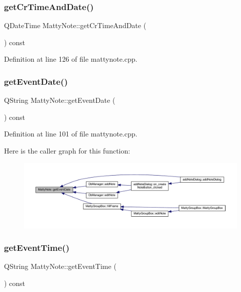 \subsubsection{\texorpdfstring{get\+Cr\+Time\+And\+Date()}{getCrTimeAndDate()}}
{\footnotesize\ttfamily Q\+Date\+Time Matty\+Note\+::get\+Cr\+Time\+And\+Date (\begin{DoxyParamCaption}{ }\end{DoxyParamCaption}) const}



Definition at line 126 of file mattynote.\+cpp.

\hypertarget{classMattyNote_a7294508de8cdfcb923fae6b3b44ff406}{}\label{classMattyNote_a7294508de8cdfcb923fae6b3b44ff406} 
\subsubsection{\texorpdfstring{get\+Event\+Date()}{getEventDate()}}
{\footnotesize\ttfamily Q\+String Matty\+Note\+::get\+Event\+Date (\begin{DoxyParamCaption}{ }\end{DoxyParamCaption}) const}



Definition at line 101 of file mattynote.\+cpp.

Here is the caller graph for this function\+:
\nopagebreak
\begin{figure}[H]
\begin{center}
\leavevmode
\includegraphics[width=350pt]{classMattyNote_a7294508de8cdfcb923fae6b3b44ff406_icgraph}
\end{center}
\end{figure}
\hypertarget{classMattyNote_a879acc827b2dcc59e9ab43205a252542}{}\label{classMattyNote_a879acc827b2dcc59e9ab43205a252542} 
\subsubsection{\texorpdfstring{get\+Event\+Time()}{getEventTime()}}
{\footnotesize\ttfamily Q\+String Matty\+Note\+::get\+Event\+Time (\begin{DoxyParamCaption}{ }\end{DoxyParamCaption}) const}



